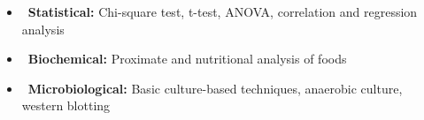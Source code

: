 
\begin{itemize}
    \item[] \textbullet\, \textbf{Statistical:} Chi-square test, t-test, ANOVA, correlation and regression analysis
    \item[] \textbullet\, \textbf{Biochemical:} Proximate and nutritional analysis of foods
    \item[] \textbullet\, \textbf{Microbiological:} Basic culture-based techniques, anaerobic culture, western blotting
\end{itemize}
















